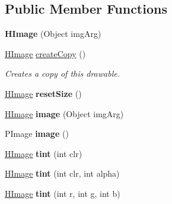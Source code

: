 \subsection*{Public Member Functions}
\begin{DoxyCompactItemize}
\item 
\hypertarget{classhype_1_1drawable_1_1_h_image_a36b711117f122c98e90ca69333fac647}{{\bfseries H\-Image} (Object img\-Arg)}\label{classhype_1_1drawable_1_1_h_image_a36b711117f122c98e90ca69333fac647}

\item 
\hyperlink{classhype_1_1drawable_1_1_h_image}{H\-Image} \hyperlink{classhype_1_1drawable_1_1_h_image_ab6908e86219c02c5f48f92bf9300eba9}{create\-Copy} ()
\begin{DoxyCompactList}\small\item\em Creates a copy of this drawable. \end{DoxyCompactList}\item 
\hypertarget{classhype_1_1drawable_1_1_h_image_ad4c1133fc8f5075e901a573e240d896e}{\hyperlink{classhype_1_1drawable_1_1_h_image}{H\-Image} {\bfseries reset\-Size} ()}\label{classhype_1_1drawable_1_1_h_image_ad4c1133fc8f5075e901a573e240d896e}

\item 
\hypertarget{classhype_1_1drawable_1_1_h_image_aa134e49466b848b5edb764d1e6e4ae52}{\hyperlink{classhype_1_1drawable_1_1_h_image}{H\-Image} {\bfseries image} (Object img\-Arg)}\label{classhype_1_1drawable_1_1_h_image_aa134e49466b848b5edb764d1e6e4ae52}

\item 
\hypertarget{classhype_1_1drawable_1_1_h_image_a5e7a802a38cfa64e9f1b65a690da5c87}{P\-Image {\bfseries image} ()}\label{classhype_1_1drawable_1_1_h_image_a5e7a802a38cfa64e9f1b65a690da5c87}

\item 
\hypertarget{classhype_1_1drawable_1_1_h_image_abb24b279dbca979748164ea41d718b94}{\hyperlink{classhype_1_1drawable_1_1_h_image}{H\-Image} {\bfseries tint} (int clr)}\label{classhype_1_1drawable_1_1_h_image_abb24b279dbca979748164ea41d718b94}

\item 
\hypertarget{classhype_1_1drawable_1_1_h_image_a90ddb7283518bb1716f542e7fb81be85}{\hyperlink{classhype_1_1drawable_1_1_h_image}{H\-Image} {\bfseries tint} (int clr, int alpha)}\label{classhype_1_1drawable_1_1_h_image_a90ddb7283518bb1716f542e7fb81be85}

\item 
\hypertarget{classhype_1_1drawable_1_1_h_image_ab1f3b794734b3bf69a8ae730cb341f49}{\hyperlink{classhype_1_1drawable_1_1_h_image}{H\-Image} {\bfseries tint} (int r, int g, int b)}\label{classhype_1_1drawable_1_1_h_image_ab1f3b794734b3bf69a8ae730cb341f49}


\end{DoxyCompactItemize}
